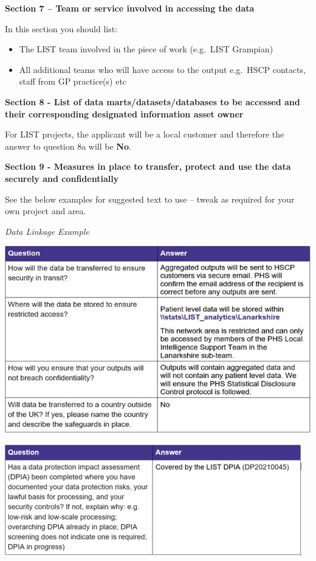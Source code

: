 \documentclass[
]{book}
\begin{document}
\textbf{Section 7 -- Team or service involved in accessing the data}

In this section you should list:

\begin{itemize}
\item
  The LIST team involved in the piece of work (e.g.~LIST Grampian)
\item
  All additional teams who will have access to the output e.g.~HSCP contacts, staff from GP practice(s) etc
\end{itemize}

\textbf{Section 8 - List of data marts/datasets/databases to be accessed and their corresponding designated information asset owner}

For LIST projects, the applicant will be a local customer and therefore the answer to question 8a will be \textbf{No}.

\textbf{Section 9 - Measures in place to transfer, protect and use the data securely and confidentially}

See the below examples for suggested text to use -- tweak as required for your own project and area.

\emph{Data Linkage Example}

\includegraphics[width=1\linewidth]{imgs/drl-linkage-1}

\includegraphics[width=1\linewidth]{imgs/drl-linkage-2}
\end{document}
